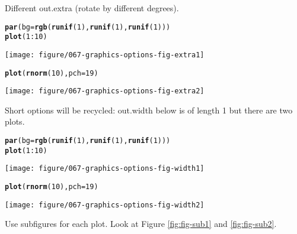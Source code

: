 \documentclass{article}\usepackage{graphicx, color}
\makeatletter
\newcommand{\hlfunctioncall}[1]{\textcolor[rgb]{0.501960784313725,0,0.329411764705882}{\textbf{#1}}}%
\newenvironment{kframe}{%
 \def\at@end@of@kframe{}%
 \ifinner\ifhmode%
  \def\at@end@of@kframe{\end{minipage}}%
  \begin{minipage}{\columnwidth}%
 \fi\fi%
 \def\FrameCommand##1{\hskip\@totalleftmargin \hskip-\fboxsep
 \colorbox{shadecolor}{##1}\hskip-\fboxsep
     \hskip-\linewidth \hskip-\@totalleftmargin \hskip\columnwidth}%
 \MakeFramed {\advance\hsize-\width
   \@totalleftmargin\z@ \linewidth\hsize
   \@setminipage}}%
 {\par\unskip\endMakeFramed%
 \at@end@of@kframe}
\newenvironment{knitrout}{}{} %
\makeatother
\begin{document}
Different out.extra (rotate by different degrees).

\begin{knitrout}
\color{fgcolor}\begin{kframe}
\begin{alltt}
\hlfunctioncall{par}(bg = \hlfunctioncall{rgb}(\hlfunctioncall{runif}(1), \hlfunctioncall{runif}(1), \hlfunctioncall{runif}(1)))
\hlfunctioncall{plot}(1:10)
\end{alltt}
\end{kframe}
\texttt{[image: figure/067-graphics-options-fig-extra1]} 
\begin{kframe}\begin{alltt}
\hlfunctioncall{plot}(\hlfunctioncall{rnorm}(10), pch = 19)
\end{alltt}
\end{kframe}
\texttt{[image: figure/067-graphics-options-fig-extra2]} 

\end{knitrout}


Short options will be recycled: out.width below is of length 1 but there are two plots.

\begin{knitrout}
\color{fgcolor}\begin{kframe}
\begin{alltt}
\hlfunctioncall{par}(bg = \hlfunctioncall{rgb}(\hlfunctioncall{runif}(1), \hlfunctioncall{runif}(1), \hlfunctioncall{runif}(1)))
\hlfunctioncall{plot}(1:10)
\end{alltt}
\end{kframe}
\texttt{[image: figure/067-graphics-options-fig-width1]} 
\begin{kframe}\begin{alltt}
\hlfunctioncall{plot}(\hlfunctioncall{rnorm}(10), pch = 19)
\end{alltt}
\end{kframe}
\texttt{[image: figure/067-graphics-options-fig-width2]} 

\end{knitrout}


Use subfigures for each plot. Look at Figure \ref{fig:fig-sub1} and \ref{fig:fig-sub2}.
\end{document}
